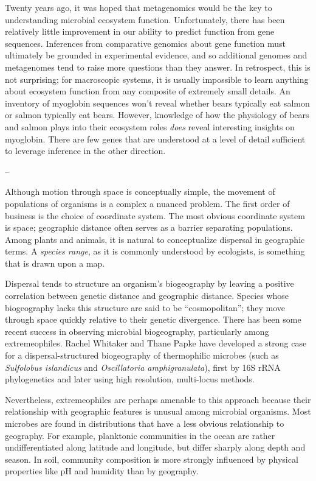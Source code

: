 Twenty years ago, it was hoped that metagenomics would be the key to understanding microbial ecosystem function. Unfortunately, there has been relatively little improvement in our ability to predict function from gene sequences. Inferences from comparative genomics about gene function must ultimately be grounded in experimental evidence, and so additional genomes and metagenomes tend to raise more questions than they answer. In retrospect, this is not surprising; for macroscopic systems, it is usually impossible to learn anything about ecosystem function from any composite of extremely small details. An inventory of myoglobin sequences won't reveal whether bears typically eat salmon or salmon typically eat bears. However, knowledge of how the physiology of bears and salmon plays into their ecosystem roles {\em does} reveal interesting insights on myoglobin. There are few genes that are understood at a level of detail sufficient to leverage inference in the other direction.

--

Although motion through space is conceptually simple, the movement of populations of organisms is a complex a nuanced problem. The first order of business is the choice of coordinate system. The most obvious coordinate system is space; geographic distance often serves as a barrier separating populations. Among plants and animals, it is natural to conceptualize dispersal in geographic terms. A {\em species range}, as it is commonly understood by ecologists, is something that is drawn upon a map. 



Dispersal tends to structure an organism's biogeography by leaving a positive correlation between genetic distance and geographic distance. Species whose biogeography lacks this structure are said to be ``cosmopolitan''; they move through space quickly relative to their genetic divergence. There has been some recent success in observing microbial biogeography, particularly among extremeophiles. Rachel Whitaker and Thane Papke have developed a strong case for a dispersal-structured biogeography of thermophilic microbes (such as {\em Sulfolobus islandicus} and {\em Oscillatoria amphigranulata}), first by 16S rRNA phylogenetics and later using high resolution, multi-locus methods.

Nevertheless, extremeophiles are perhaps amenable to this approach because their relationship with geographic features is unusual among microbial organisms. Most microbes are found in distributions that have a less obvious relationship to geography. For example, planktonic communities in the ocean are rather undifferentiated along latitude and longitude, but differ sharply along depth and season. In soil, community composition is more strongly influenced by physical properties like pH and humidity than by geography. 


